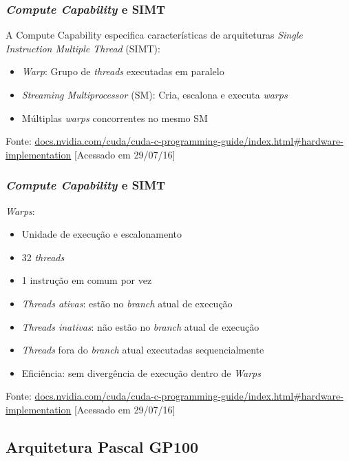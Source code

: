 \documentclass[10pt, compress]{beamer}
\begin{document}
\begin{frame}
    \frametitle{\textit{Compute Capability} e SIMT}
    A \alert{Compute Capability} especifica características de
    arquiteturas \textit{Single Instruction Multiple Thread} (SIMT):
    \begin{itemize}
        \item \textit{Warp}: Grupo de \textit{threads} executadas em \alert{paralelo}
        \item \textit{Streaming Multiprocessor} (SM): Cria, escalona e executa \textit{warps}
        \item Múltiplas \textit{warps} \alert{concorrentes} no mesmo SM
    \end{itemize}
    \vfill

    \begin{center}
        \tiny{Fonte: \url{docs.nvidia.com/cuda/cuda-c-programming-guide/index.html\#hardware-implementation} [Acessado em 29/07/16]}
    \end{center}
\end{frame}

\begin{frame}
    \frametitle{\textit{Compute Capability} e SIMT}
    \textit{Warps}:
    \begin{itemize}
        \item Unidade de execução e escalonamento
        \item 32 \textit{threads}
        \item 1 \alert{instrução em comum} por vez
        \item \textit{Threads ativas}: estão no \textit{branch} atual de
            execução
        \item \textit{Threads inativas}: \alert{não} estão no \textit{branch}
            atual de execução
        \item \textit{Threads} fora do \textit{branch} atual executadas
            \alert{sequencialmente}
        \item Eficiência: sem divergência de execução dentro de \textit{Warps}
    \end{itemize}
    \vfill

    \begin{center}
        \tiny{Fonte: \url{docs.nvidia.com/cuda/cuda-c-programming-guide/index.html\#hardware-implementation} [Acessado em 29/07/16]}
    \end{center}
\end{frame}

\subsection{Arquitetura Pascal GP100}
\end{document}
